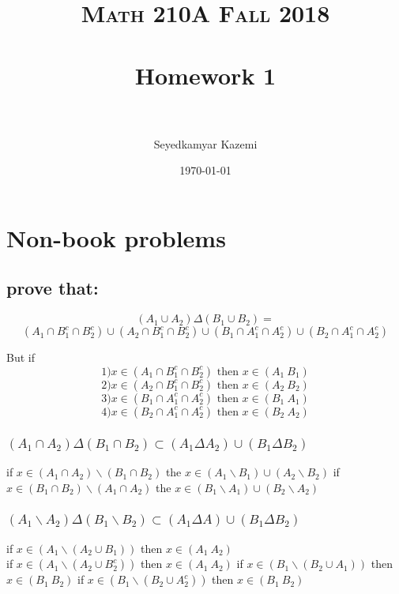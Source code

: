 \documentclass[paper=letter, fontsize=11pt]{scrartcl} %
\title{	
\normalfont \normalsize 
\textsc{Math 210A Fall 2018} \\ [25pt] %
\horrule{0.5pt} \\[0.4cm] %
\huge Homework 1\\ %
\horrule{2pt} \\[0.5cm] %
}
\author{Seyedkamyar Kazemi} %
\date{\normalsize\today} %
\begin{document}
\maketitle
\section{Non-book problems}
\subsection{\textbf{prove that:}}


    $$(A_1 \cup A_2)\Delta(B_1 \cup B_2)=$$
    $$(A_1 \cap B_1^c\cap B_2^c)\cup (A_2 \cap B_1 ^ c \cap B_2 ^c)\cup(B_1 \cap A_1^c\cap A_2^c)\cup (B_2 \cap A_1 ^ c \cap A_2 ^c)$$


But if 
$$ 1) x \in (A_1 \cap B_1^c\cap B_2^c) \text{ then } x \in (A_1 \ B_1)$$
$$ 2) x \in (A_2 \cap B_1^c\cap B_2^c) \text{ then } x \in (A_2 \ B_2)$$
$$ 3) x \in (B_1 \cap A_1^c\cap A_2^c) \text{ then } x \in (B_1 \ A_1)$$
$$ 4) x \in (B_2 \cap A_1^c\cap A_2^c) \text{ then } x \in (B_2 \ A_2)$$
\subsubsection{$(A_1\cap A_2) \Delta (B_1 \cap B_2) \subset (A_1\Delta A_2) \cup (B_1 \Delta B_2)$}
if $x \in (A_1 \cap A_2) \backslash (B_1 \cap B_2)$ the $x \in  (A_1 \backslash B_1) \cup (A_2 \backslash B_2)$
if $x \in (B_1 \cap B_2) \backslash (A_1 \cap A_2)$ the $x \in  (B_1 \backslash A_1) \cup (B_2 \backslash A_2)$

\subsubsection{$(A_1\backslash A_2) \Delta (B_1 \backslash B_2) \subset (A_1\Delta A) \cup (B_1 \Delta B_2)$}
if $x \in (A_1 \backslash (A_2 \cup B_1))$ then $x \in (A_1 \ A_2)$\\
if $x \in (A_1 \backslash (A_2 \cup B_2 ^ c))$ then $x \in (A_1 \ A_2)$
if $x \in (B_1 \backslash (B_2 \cup A_1))$ then $x \in (B_1 \ B_2)$
if $x \in (B_1 \backslash (B_2 \cup A_2 ^ c))$ then $x \in (B_1 \ B_2)$
\end{document}
